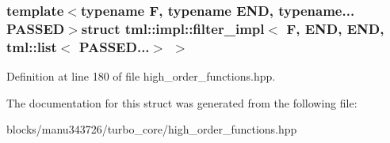 \subsubsection*{template$<$typename F, typename E\+N\+D, typename... P\+A\+S\+S\+E\+D$>$struct tml\+::impl\+::filter\+\_\+impl$<$ F, E\+N\+D, E\+N\+D, tml\+::list$<$ P\+A\+S\+S\+E\+D...$>$ $>$}



Definition at line 180 of file high\+\_\+order\+\_\+functions.\+hpp.



The documentation for this struct was generated from the following file\+:\begin{DoxyCompactItemize}
\item 
blocks/manu343726/turbo\+\_\+core/high\+\_\+order\+\_\+functions.\+hpp\end{DoxyCompactItemize}
